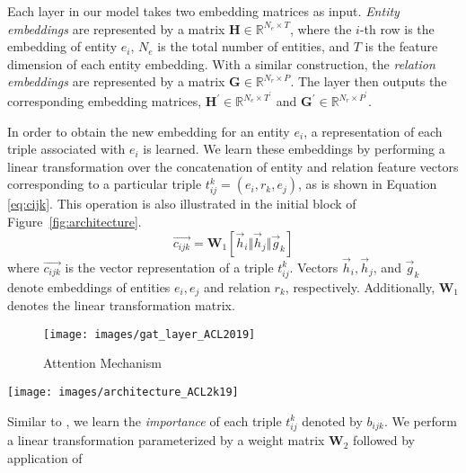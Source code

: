 \documentclass[11pt,a4paper]{article}
\begin{document}
Each layer in our model takes two embedding matrices as input. \emph{Entity embeddings} are represented by a matrix \(\textbf{H} \in \mathbb{R}^{N_e \times T} \), where the \(i\)-th row is the embedding of entity  \(e_i\), \(N_e\) is the total number of entities, and \(T\) is the feature dimension of each entity embedding. 
With a similar construction, the \emph{relation embeddings} are represented by a matrix \(\textbf{G} \in \mathbb{R}^{N_r \times P}\). The layer then outputs the corresponding embedding matrices, \(\textbf{H}^\prime \in \mathbb{R}^{N_e \times T^\prime} \) and  \(\textbf{G}^\prime \in \mathbb{R}^{N_r \times P^\prime} \).



In order to obtain the new embedding for an entity \(e_i\), a representation of each triple associated with \(e_i\) is learned. We learn these embeddings by performing a linear transformation over the concatenation of entity and relation feature vectors corresponding to a particular triple \(t_{ij}^{k} = (e_i, r_k, e_j)\), as is shown in Equation \ref{eq:cijk}. This operation is also illustrated in the initial block of Figure~\ref{fig:architecture}.
\begin{equation}\label{eq:cijk}
 \vec{c_{ijk}} = \textbf{W}_{1} [\vec{h}_{i} \Vert \vec{h}_{j} \Vert \vec{g}_{k}] 
\end{equation}
where \(\vec{c_{ijk} }\) is the vector representation of a triple \(t_{ij}^k\). Vectors \(\vec{h}_i, \vec{h}_j\), and \(\vec{g}_k\) denote embeddings of entities \(e_i, e_j\) and relation \(r_k\), respectively. Additionally, \(\textbf{W}_1\) denotes the linear transformation matrix. \begin{figure}[tbp]
\centering
  \texttt{[image: images/gat\_layer\_ACL2019]}
  \caption{Attention Mechanism}
  \label{fig:layer}
\end{figure}
\begin{figure*}
  \texttt{[image: images/architecture\_ACL2k19]}
  \caption{This figure shows end-to-end architecture of our model. Dashed arrows in the figure represent concatenation operation. Green circles represents initial entity embedding vectors and yellow circles represents initial relation embedding vectors.}
  \label{fig:architecture}
\end{figure*}
Similar to \cite{velickovic2018graph}, we learn the \emph{importance} of each triple \(t_{ij}^{k}\) denoted by \(b_{ijk}\). 
We perform a linear transformation parameterized by a weight matrix \(\textbf{W}_2\) followed by application of 
\end{document}
